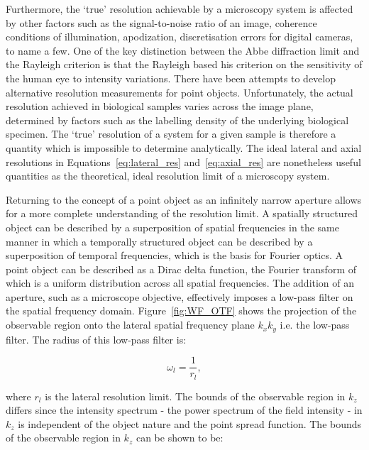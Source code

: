 Furthermore, the `true' resolution achievable by a microscopy system is 
affected by other factors such as the signal-to-noise ratio of an
image, coherence conditions of illumination, apodization, discretisation 
errors for digital cameras, to name a few\cite{den1997resolution}. One of the 
key distinction between the Abbe diffraction limit and the Rayleigh 
criterion is that the Rayleigh based his criterion on the sensitivity of the 
human eye to intensity variations\cite{weisenburger2015light}. There have 
been attempts to develop alternative resolution measurements for point 
objects\cite{ram2006beyond}. Unfortunately, the actual resolution achieved in 
biological samples varies across the image plane, determined by factors such 
as the labelling density of the underlying biological 
specimen\cite{culley2017nanoj}. The `true' resolution of a system for a given 
sample is therefore a quantity which is impossible to determine analytically. 
The ideal lateral and axial resolutions in Equations~\ref{eq:lateral_res} 
and~\ref{eq:axial_res} are nonetheless useful quantities as the theoretical, 
ideal resolution limit of a microscopy system.

Returning to the concept of a point object as an infinitely narrow aperture allows 
for a more complete understanding of the resolution limit. A spatially structured 
object can be described by a superposition of spatial frequencies in the same 
manner in which a temporally structured object can be described by a superposition 
of temporal frequencies, which is the basis for Fourier 
optics\cite{goodman2005introduction}. A point object can be described as a Dirac
delta function, the Fourier transform of which is a uniform distribution across all
spatial frequencies. The addition of an aperture, such as a microscope objective, 
effectively imposes a low-pass filter on the spatial frequency domain. 
Figure~\ref{fig:WF_OTF} shows the projection of the observable region onto the 
lateral spatial frequency plane $k_{x}k_{y}$ i.e. the low-pass filter. The radius of
this low-pass filter is: 

\begin{equation}\label{eq:lateral_spatial_freq_res}
\omega_{l} = \frac{1}{r_{l}},
\end{equation}

where $r_{l}$ is the lateral resolution limit. The bounds of the observable region 
in $k_{z}$ differs since the intensity spectrum - the power spectrum of the 
field intensity - in $k_{z}$ is independent of the object nature and the point
spread function\cite{frieden1967optical}. The bounds of the observable region in
$k_{z}$ can be shown to be:

